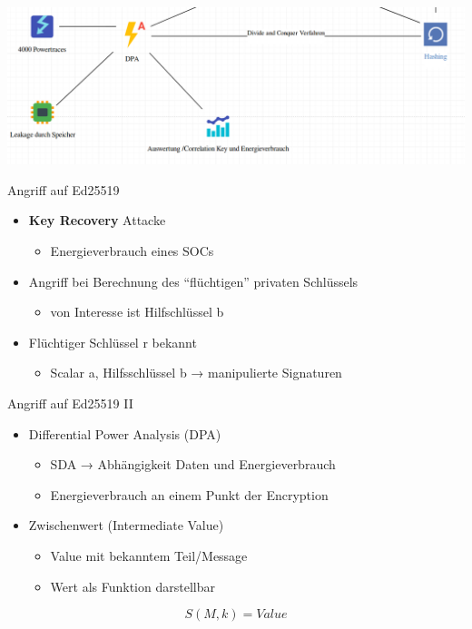 \documentclass[
  10pt,
  ignorenonframetext,
  aspectratio=43,
]{beamer}
\providecommand{\tightlist}{%
  \setlength{\itemsep}{0pt}\setlength{\parskip}{0pt}}
\begin{document}
\begin{frame}{}
\protect\hypertarget{section-22}{}
\includegraphics{Abbildungen/Punkt4.png}
\end{frame}

\begin{frame}{Angriff auf Ed25519}
\protect\hypertarget{angriff-auf-ed25519}{}
\begin{itemize}
\tightlist
\item
  \textbf{Key Recovery} Attacke

  \begin{itemize}
  \tightlist
  \item
    Energieverbrauch eines SOCs
  \end{itemize}
\item
  Angriff bei Berechnung des ``flüchtigen'' privaten Schlüssels

  \begin{itemize}
  \tightlist
  \item
    von Interesse ist Hilfschlüssel b
  \end{itemize}
\item
  Flüchtiger Schlüssel r bekannt

  \begin{itemize}
  \tightlist
  \item
    Scalar a, Hilfsschlüssel b → manipulierte Signaturen
  \end{itemize}
\end{itemize}
\end{frame}

\begin{frame}{Angriff auf Ed25519 II}
\protect\hypertarget{angriff-auf-ed25519-ii}{}
\begin{itemize}
\tightlist
\item
  Differential Power Analysis (DPA)

  \begin{itemize}
  \tightlist
  \item
    SDA → Abhängigkeit Daten und Energieverbrauch
  \item
    Energieverbrauch an einem Punkt der Encryption
  \end{itemize}
\item
  Zwischenwert (Intermediate Value)

  \begin{itemize}
  \tightlist
  \item
    Value mit bekanntem Teil/Message
  \item
    Wert als Funktion darstellbar
  \end{itemize}
\end{itemize}

\[ S(M,k) = Value \]
\end{frame}
\end{document}
